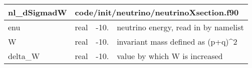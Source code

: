 \documentclass{article}
\begin{document}
\begin{longtable}{llll}
\toprule
\textbf{\large{nl\_dSigmadW}} & \multicolumn{3}{l}{\footnotesize{code/init/neutrino/neutrinoXsection.f90}}\\*
\midrule
\endfirsthead
\midrule
\endhead
enu & \begin{minipage}[t]{2cm}real\end{minipage} & \begin{minipage}[t]{2cm}-10.\end{minipage} & \begin{minipage}[t]{12cm}neutrino energy, read in by namelist\end{minipage}\\*
\midrule
W & \begin{minipage}[t]{2cm}real\end{minipage} & \begin{minipage}[t]{2cm}-10.\end{minipage} & \begin{minipage}[t]{12cm}invariant mass defined as (p+q)\^{}2\end{minipage}\\*
\midrule
delta\_W & \begin{minipage}[t]{2cm}real\end{minipage} & \begin{minipage}[t]{2cm}-10.\end{minipage} & \begin{minipage}[t]{12cm}value by which W is increased\end{minipage}\\*
\bottomrule
\end{longtable}
{ }



\end{document}

